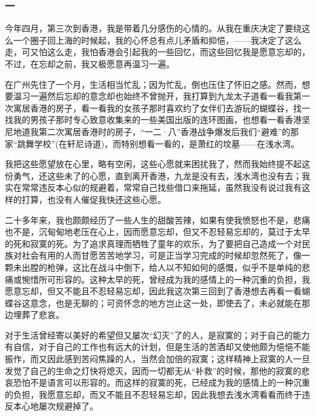 \subsubsection*{一}
\par 今年四月，第三次到香港，我是带着几分感伤的心情的。从我在重庆决定了要绕这么一个圈子回上海的时候起，我的心怀总有点儿矛盾和抑悒，——我决定了这么走，可又怕这么走，我怕香港会引起我的一些回忆，而这些回忆我是愿意忘却的，不过，在忘却之前，我又极愿意再温习一遍。
\par 在广州先住了一个月，生活相当忙乱；因为忙乱，倒也压住了怀旧之感。然而，想要温习一遍然后忘却的意念却也始终不曾抛开，我打算到九龙太子道看一看我第一次寓居香港的房子，看一看我的女孩子那时喜欢约了女伴们去游玩的蝴蝶谷，找一找我的男孩子那时专心致意收集来的一些美国出版的连环图画，也想看一看香港坚尼地道我第二次寓居香港时的房子，“一二·八”香港战争爆发后我们“避难”的那家“跳舞学校”(在轩尼诗道)，而特别想看一看的，是萧红的坟墓——在浅水湾。
\par 我把这些愿望放在心里，略有空闲，这些心愿就来困扰我了，然而我始终提不起这份勇气，还这些未了的心愿，直到离开香港，九龙是没有去，浅水湾也没有去；我实在常常违反本心似的规避着，常常自己找些借口来拖延，虽然我没有说过我有这样的打算，也没有人催促我快还这些心愿。
\par 二十多年来，我也颇颇经历了一些人生的甜酸苦辣，如果有使我愤怒也不是，悲痛也不是，沉甸甸地老压在心上，因而愿意忘却，但又不忍轻易忘却的，莫过于太早的死和寂寞的死。为了追求真理而牺牲了童年的欢乐，为了要把自己造成一个对民族对社会有用的人而甘愿苦苦地学习，可是正当学习完成的时候却忽然死了，像一颗未出膛的枪弹，这比在战斗中倒下，给人以不知如何的感慨，似乎不是单纯的悲痛或惋惜所可形容的。这种太早的死，曾经成为我的感情上的一种沉重的负担，我愿意忘却，但又不能且不忍轻易忘却，因此我这次第三回到了香港想去再看一看蝴蝶谷这意念，也是无聊的；可资怀念的地方岂止这一处，即使去了，未必就能在那边埋葬了悲哀。
\par 对于生活曾经寄以美好的希望但又屡次“幻灭”了的人，是寂寞的；对于自己的能力有自信，对于自己的工作也有远大的计划，但是生活的苦酒却又使他颇为悒悒不能振作，而又因此感到苦闷焦躁的人，当然会加倍的寂寞；这样精神上寂寞的人一旦发觉了自己的生命之灯快将熄灭，因而一切都无从“补救”的时候，那他的寂寞的悲哀恐怕不是语言可以形容的。而这样的寂寞的死，已经成为我的感情上的一种沉重的负担，我愿意忘却，而又不能且不忍轻易忘却，因此我想去浅水湾看看而终于违反本心地屡次规避掉了。
